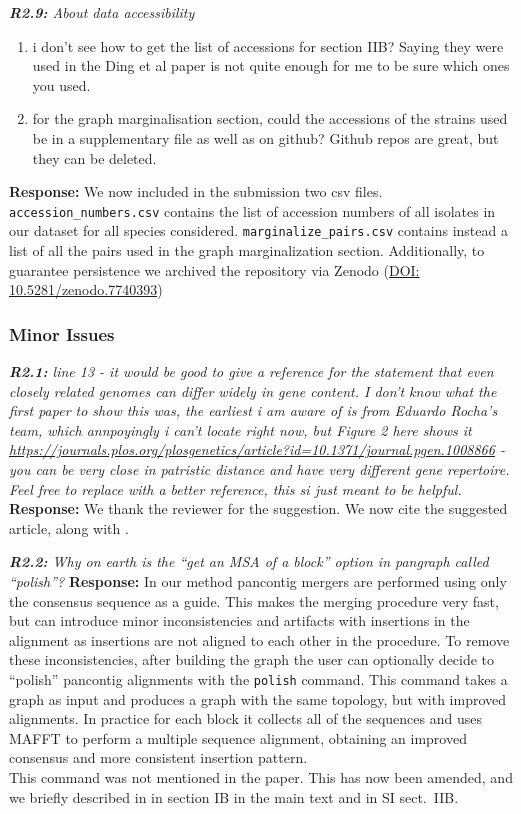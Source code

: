 \documentclass[aps,rmp,onecolumn]{revtex4-1}
\newcommand{\reviewer}[2]{{\it \textbf{#1:} #2\vskip 5mm}}
\newcommand{\response}[1]{{{\color{response}\textbf{Response:} #1}}\vskip 5mm}
\newcommand{\SIalgo}{II}
\begin{document}
\reviewer{R2.9}{About data accessibility
      \begin{enumerate}
            \item i don't see how to get the list of accessions for section IIB? Saying they were used in the Ding et al paper is not quite enough for me to be sure which ones you used.
            \item for the graph marginalisation section, could the accessions of the strains used be in a supplementary file as well as on github? Github repos are great, but they can be deleted.
      \end{enumerate}}
\response{We now included in the submission two csv files. \texttt{accession\_numbers.csv} contains the list of accession numbers of all isolates in our dataset for all species considered. \texttt{marginalize\_pairs.csv} contains instead a list of all the pairs used in the graph marginalization section. Additionally, to guarantee persistence we archived the repository via Zenodo (\href{https://doi.org/10.5281/zenodo.7740393}{DOI: 10.5281/zenodo.7740393})
}

\subsubsection*{Minor Issues}

\reviewer{R2.1}{line 13 - it would be good to give a reference for the statement that even closely related genomes can differ widely in gene content.
I don't know what the first paper to show this was, the earliest i am aware of is from Eduardo Rocha's team, which annpoyingly i can't locate right now, but Figure 2 here shows it \url{https://journals.plos.org/plosgenetics/article?id=10.1371/journal.pgen.1008866} \cite{touchon2020phylogenetic} - you can be very close in patristic distance and have very different gene repertoire.
Feel free to replace with a better reference, this si just meant to be helpful.}
\response{We thank the reviewer for the suggestion. We now cite the suggested article, along with \cite{touchon2009organised,doolittle2009origin}.}

\reviewer{R2.2}{Why on earth is the ``get an MSA of a block'' option in pangraph called ``polish''?}
\response{In our method pancontig mergers are performed using only the consensus sequence as a guide. This makes the merging procedure very fast, but can introduce minor inconsistencies and artifacts with insertions in the alignment as insertions are not aligned to each other in the procedure.
To remove these inconsistencies, after building the graph the user can optionally decide to ``polish'' pancontig alignments with the \texttt{polish} command. This command takes a graph as input and produces a graph with the same topology, but with improved alignments. In practice for each block it collects all of the sequences and uses MAFFT \cite{katoh2002mafft} to perform a multiple sequence alignment, obtaining an improved consensus and more consistent insertion pattern.\\
This command was not mentioned in the paper. This has now been amended, and we briefly described in in section IB in the main text and in SI sect.~{\SIalgo}B.}
\end{document}
